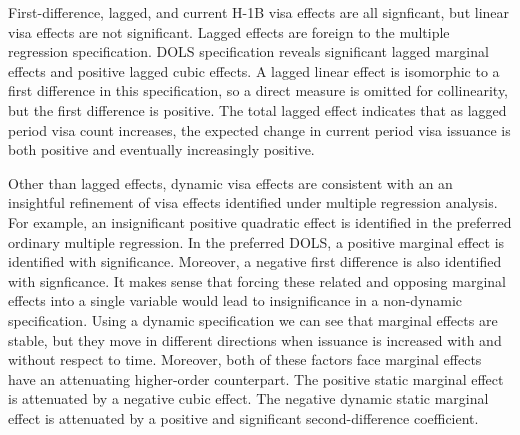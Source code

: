 \documentclass[review]{elsarticle}
\begin{document}

    First-difference, lagged, and current H-1B visa effects are all signficant,
    but linear visa effects are not significant.
    Lagged effects are foreign to the multiple regression specification.
    DOLS specification reveals significant lagged marginal effects and positive
    lagged cubic effects.
    A lagged linear effect is isomorphic to a first difference in this specification,
    so a direct measure is omitted for collinearity,
    but the first difference is positive.
    The total lagged effect indicates that as lagged period visa count increases,
    the expected change in current period visa issuance is both positive and eventually increasingly positive.

    Other than lagged effects, dynamic visa effects are consistent with an an insightful refinement of
    visa effects identified under multiple regression analysis.
    For example, an insignificant positive quadratic effect is identified in the preferred ordinary multiple regression.
    In the preferred DOLS, a positive marginal effect is identified with significance.
    Moreover, a negative first difference is also identified with signficance.
    It makes sense that forcing these related and opposing marginal effects into a single variable would lead
    to insignificance in a non-dynamic specification.
    Using a dynamic specification we can see that marginal effects are stable,
    but they move in different directions when issuance is increased with and without respect to time.
    Moreover, both of these factors face marginal effects have an attenuating higher-order counterpart.
    The positive static marginal effect is attenuated by a negative cubic effect.
    The negative dynamic static marginal effect is attenuated by a positive and significant second-difference coefficient.
\end{document}
